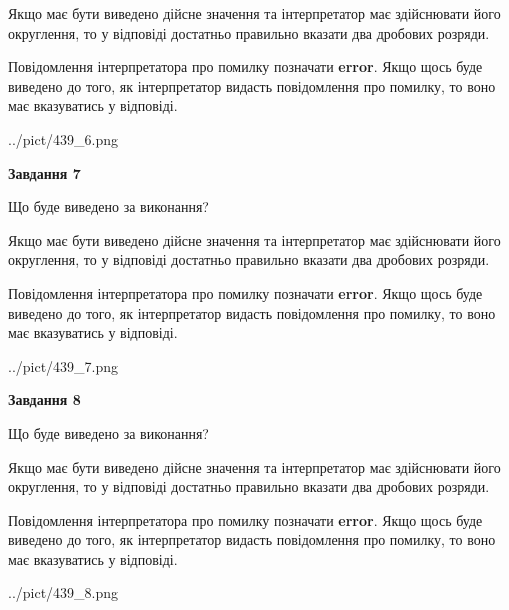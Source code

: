 \documentclass[12pt, ukrainian]{article}
\begin{document}
{\begin {Large}
Якщо має бути виведено дійсне значення та інтерпретатор має здійснювати його округлення, 
то у відповіді достатньо правильно вказати два дробових розряди.

Повідомлення інтерпретатора про помилку позначати \textbf{error}.
Якщо щось буде виведено до того, як інтерпретатор видасть повідомлення про помилку, 
то воно має вказуватись у відповіді. \par

\begin{center}
	{../pict/439_6.png}
\end{center}
\newpage

{\begin {center}\textbf{Завдання 7}\end {center}}\par
Що буде виведено за виконання? \par

Якщо має бути виведено дійсне значення та інтерпретатор має здійснювати його округлення, 
то у відповіді достатньо правильно вказати два дробових розряди.

Повідомлення інтерпретатора про помилку позначати \textbf{error}.
Якщо щось буде виведено до того, як інтерпретатор видасть повідомлення про помилку, 
то воно має вказуватись у відповіді. \par

\begin{center}
	{../pict/439_7.png}
\end{center}
\newpage

{\begin {center}\textbf{Завдання 8}\end {center}}\par
Що буде виведено за виконання? \par

Якщо має бути виведено дійсне значення та інтерпретатор має здійснювати його округлення, 
то у відповіді достатньо правильно вказати два дробових розряди.

Повідомлення інтерпретатора про помилку позначати \textbf{error}.
Якщо щось буде виведено до того, як інтерпретатор видасть повідомлення про помилку, 
то воно має вказуватись у відповіді. \par

\begin{center}
	{../pict/439_8.png}
\end{center}
\newpage


\end{Large}}
\end{document}
